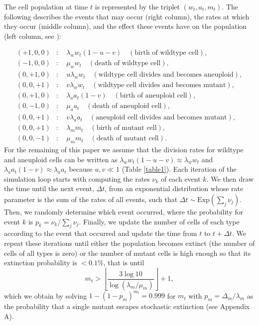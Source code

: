 \documentclass[12pt]{extarticle}
\begin{document}
The cell population at time $t$ is represented by the triplet $\left(w_t,a_t,m_t\right)$. The following describes the events that may occur (right column), the rates at which they occur (middle column), and the effect these events have on the population (left column, see ):

\begin{subequations}
\begin{flalign*}
(+1,0,0)&:\quad \lambda_ww_t\left(1-u-v\right)\quad\left(\text{birth of wildtype cell}\right),\\
(-1,0,0)&:\quad \mu_ww_t\quad\left(\text{death of wildtype cell}\right),\\
(0,+1,0)&:\quad u\lambda_ww_t\quad\left(\text{wildtype cell divides and becomes aneuploid}\right),\\
(0,0,+1)&:\quad v\lambda_ww_t\quad\left(\text{wildtype cell divides and becomes mutant}\right),\\
(0,+1,0)&:\quad \lambda_aa_t\left(1-v\right)\quad\left(\text{birth of aneuploid cell}\right),\\
(0,-1,0)&:\quad \mu_aa_t\quad\left(\text{death of aneuploid cell}\right),\\
(0,0,+1)&:\quad v\lambda_aa_t\quad\left(\text{aneuploid cell divides and becomes mutant}\right),\\
(0,0,+1)&:\quad \lambda_mm_t\quad\left(\text{birth of mutant cell}\right),\\
(0,0,-1)&:\quad \mu_mm_t\quad\left(\text{death of mutant cell}\right).
\end{flalign*}
\end{subequations}
For the remaining of this paper we assume that the division rates for wildtype and aneuploid cells can be written as $\lambda_ww_t\left(1-u-v\right)\approx \lambda_ww_t$ and $\lambda_aa_t\left(1-v\right)\approx\lambda_aa_t$ because $u,v\ll1$ (Table \ref{table1}).
Each iteration of the simulation loop starts with computing the rates $\nu_k$ of each event $k$.
We then draw the time until the next event, $\Delta t$, from an exponential distribution whose rate parameter is the sum of the rates of all events, such that $\Delta t \sim \text{Exp}(\sum_j \nu_j)$.
Then, we randomly determine which event occurred, where the probability for event $k$ is $p_k = \nu_k/\sum_j \nu_j$.
Finally, we update the number of cells of each type according to the event that occurred and update the time from $t$ to $t+\Delta t$.
We repeat these iterations until either the population becomes extinct (the number of cells of all types is zero) or the number of mutant cells is high enough so that its extinction probability is $<0.1\%$, that is until
\begin{equation*}
m_t > \left\lfloor\frac{3\log{10}}{\log{\left(\lambda_m / \mu_m\right)}}\right\rfloor + 1 ,
\end{equation*}
which we obtain by solving $1-(1-p_m)^{m_t}=0.999$ for $m_t$ with $p_m=\Delta_m/\lambda_m$ as the probability that a single mutant escapes stochastic extinction  (see Appendix A).
\end{document}
